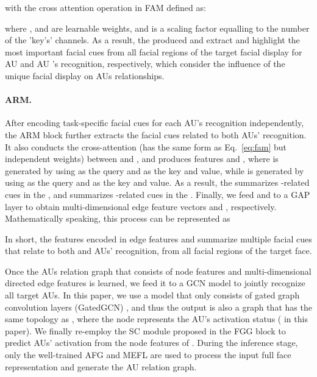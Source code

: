\documentclass{article}
\begin{document}
with the cross attention operation in FAM defined as:

where ,  and  are learnable weights, and  is a scaling factor equalling to the number of the 'key's' channels. As a result, the produced  and  extract and highlight the most important facial cues from all facial regions of the target facial display for AU  and AU 's recognition, respectively, which consider the influence of the unique facial display on AUs relationships.


\paragraph{ARM.} After encoding task-specific facial cues for each AU's recognition independently, the ARM block further extracts the facial cues related to both AUs' recognition. It also conducts the cross-attention (has the same form as Eq.~\ref{eq:fam} but independent weights) between  and , and produces features  and , where  is generated by using  as the query and  as the key and value, while  is generated by using  as the query and  as the key and value. As a result, the  summarizes -related cues in the , and  summarizes -related cues in the . Finally, we feed  and  to a GAP layer to obtain multi-dimensional edge feature vectors  and , respectively. Mathematically speaking, this process can be represented as

In short, the features encoded in edge features  and  summarize multiple facial cues that relate to both  and  AUs' recognition, from all facial regions of the target face. 


Once the AUs relation graph  that consists of  node features and  multi-dimensional directed edge features is learned, we feed it to a GCN model to jointly recognize all target AUs. In this paper, we use a model that only consists of  gated graph convolution layers (GatedGCN) \cite{bresson2017residual}, and thus the output  is also a graph that has the same topology as , where the  node  represents the  AU's activation status ( in this paper). We finally re-employ the SC module proposed in the FGG block to predict  AUs' activation from the node features of . During the inference stage, only the well-trained AFG and MEFL are used to process the input full face representation and generate the AU relation graph.
\end{document}
